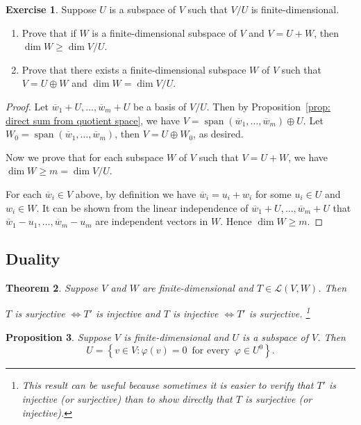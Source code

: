 \documentclass[colorlinks]{tufte-handout}
\theoremstyle{plain} %
\newtheorem{thm}{Theorem}
\newtheorem{prop}[thm]{Proposition}
\theoremstyle{definition}
\newtheorem{exer}[thm]{Exercise}
\theoremstyle{remark}
\newcommand{\bra}[1]{\mathopen{}\left(#1\right)}
\newcommand{\cbra}[1]{\mathopen{}\left\{#1\right\}}
\renewcommand{\phi}{\varphi}
\renewcommand{\L}{\mathcal{L}}
\DeclareMathOperator{\spn}{span}
\begin{document}
\begin{exer}
	Suppose $U$ is a subspace of $V$ such that $V/U$ is finite-dimensional.
	\begin{enumerate}
		\item Prove that if $W$ is a finite-dimensional subspace of $V$ and $V=U+W$, then $\dim W\geq\dim V/U$.
		\item Prove that there exists a finite-dimensional subspace $W$ of $V$ such that $V=U\oplus W$ and $\dim W=\dim V/U$.
	\end{enumerate}
\end{exer}
\begin{proof}
	Let $\overline{w}_1+U,\dots,\overline{w}_m+U$ be a basis of $V/U$. Then by Proposition~\ref{prop: direct sum from quotient space}, we have $V=\spn(\overline{w}_1,\dots,\overline{w}_m)\oplus U$. Let $W_0=\spn(\overline{w}_1,\dots,\overline{w}_m)$, then $V=U\oplus W_0$, as desired.

	Now we prove that for each subspace $W$ of $V$ such that $V=U+W$, we have $\dim W\geq m=\dim V/U$.
	
	For each $\overline{w}_i\in V$ above, by definition we have $\overline{w}_i=u_i+w_i$ for some $u_i\in U$ and $w_i\in W$. It can be shown from the linear independence of $\overline{w}_1+U,\dots,\overline{w}_m+U$ that $\overline{w}_1-u_1,\dots,\overline{w}_m-u_m$ are independent vectors in $W$. Hence $\dim W\geq m$.
\end{proof}


\subsection{Duality}
\begin{thm}
	Suppose $V$ and $W$ are finite-dimensional and $T\in\L\bra{V,W}$. Then
	\begin{center}
	$T$ is surjective $\iff T'$ is injective \quad and \quad $T$ is injective $\iff T'$ is surjective.%
    \footnote{This result can be useful because sometimes it is easier to verify that $T'$ is injective (or surjective) than to show directly that $T$ is surjective (or injective).}
	\end{center}
\end{thm}

\begin{prop}\label{prop: relation between subspace and annihilator}
	Suppose $V$ is finite-dimensional and $U$ is a subspace of $V$. Then
	\[U=\cbra{v\in V:\phi(v)=0\,\text{ for every }\,\phi\in U^0}.\]
\end{prop}
\end{document}
